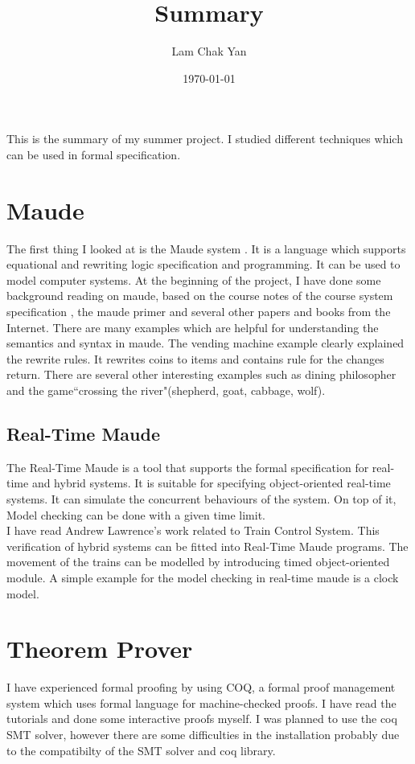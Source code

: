 \documentclass{article}
\begin{document}
\title{Summary}
\author{Lam Chak Yan}
\date{\today}
\maketitle

This is the summary of my summer project. I studied different techniques which can be used in formal specification. 
\section{Maude}
The first thing I looked at is the Maude system \cite{maude}. It is a language which supports equational and rewriting logic specification and programming. It can be used to model computer systems. 
At the beginning of the project, I have done some background reading on maude, based on the course notes of the course system specification \cite{ss}, the maude primer \cite{primer} and several other papers and books \cite{james2014verification} \cite{olveczky2004specification} \cite{clavel2007all} from the Internet. There are many examples which are helpful for understanding the semantics and syntax in maude. The vending machine example clearly explained the rewrite rules. It rewrites coins to items and contains rule for  the changes return. There are several other interesting examples such as dining philosopher and the game``crossing the river"(shepherd, goat, cabbage, wolf).

\subsection{Real-Time Maude}
The Real-Time Maude \cite{rtmaude} is a tool that supports the formal specification for real-time and hybrid systems. It is suitable for specifying object-oriented real-time systems. It can simulate the concurrent behaviours of the system. On top of it, Model checking can be done with a given time limit.
\\I have read Andrew Lawrence's work related to Train Control System.  This verification of hybrid systems can be fitted into Real-Time Maude programs.
The movement of the trains can be modelled by introducing timed object-oriented module. A simple example for the model checking in real-time maude is a clock model. 

\section{Theorem Prover}
I have experienced formal proofing by using COQ, a formal proof management system which uses formal language for machine-checked proofs. I have read the tutorials \cite{coq} and done some interactive proofs myself. I was planned to use the coq SMT solver, however there are some difficulties in the installation probably due to the compatibilty of the SMT solver and coq library.
\end{document}
